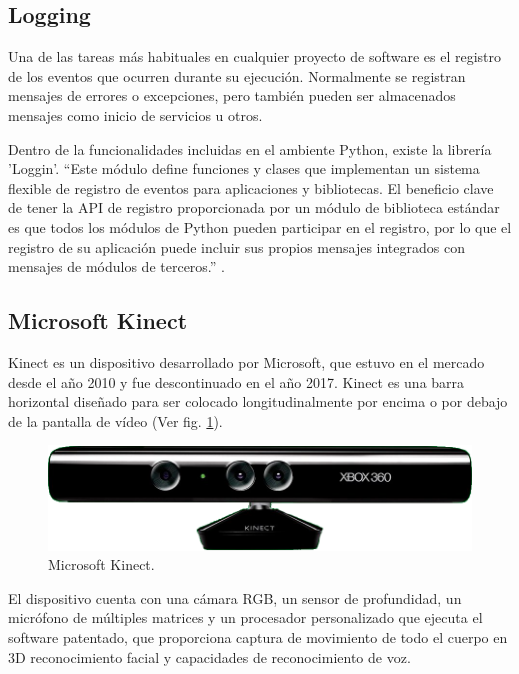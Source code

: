     \subsection{Logging}
    \label{sub:FrameLogging}
        Una de las tareas más habituales en cualquier proyecto de software es el registro de los eventos que ocurren durante su ejecución. Normalmente se registran mensajes de errores o excepciones, pero también pueden ser almacenados mensajes como inicio de servicios u otros.
        
        Dentro de la funcionalidades incluidas en el ambiente Python, existe la librería 'Loggin'. ``Este módulo define funciones y clases que implementan un sistema flexible de registro de eventos para aplicaciones y bibliotecas. El beneficio clave de tener la API de registro proporcionada por un módulo de biblioteca estándar es que todos los módulos de Python pueden participar en el registro, por lo que el registro de su aplicación puede incluir sus propios mensajes integrados con mensajes de módulos de terceros.'' \cite{Logging2019}.
    
    \subsection{Microsoft Kinect}
    \label{sub:FrameKinect}
        Kinect es un dispositivo desarrollado por Microsoft, que estuvo en el mercado desde el año 2010 y fue descontinuado en el año 2017. Kinect es una barra horizontal diseñado para ser colocado longitudinalmente por encima o por debajo de la pantalla de vídeo (Ver fig. \ref{fig:Kinect}).
        
        \begin{figure}[ht!]
        	\centering
        	\includegraphics[width=0.8\linewidth]{imgs/02-Referential/02-Kinect.png}
        	\caption[Microsoft Kinect]{Microsoft Kinect.}
    	    \label{fig:Kinect}
        \end{figure}%

        El dispositivo cuenta con una cámara RGB, un sensor de profundidad, un micrófono de múltiples matrices y un procesador personalizado que ejecuta el software patentado, que proporciona captura de movimiento de todo el cuerpo en 3D reconocimiento facial y capacidades de reconocimiento de voz.

